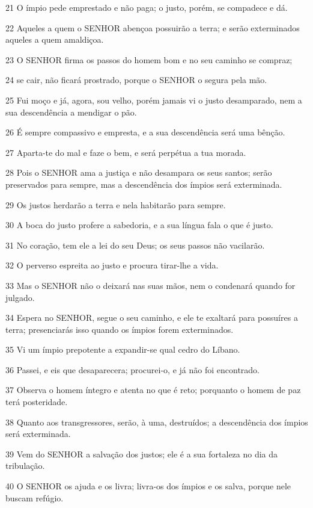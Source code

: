\par 21 O ímpio pede emprestado e não paga; o justo, porém, se compadece e dá.
\par 22 Aqueles a quem o SENHOR abençoa possuirão a terra; e serão exterminados aqueles a quem amaldiçoa.
\par 23 O SENHOR firma os passos do homem bom e no seu caminho se compraz;
\par 24 se cair, não ficará prostrado, porque o SENHOR o segura pela mão.
\par 25 Fui moço e já, agora, sou velho, porém jamais vi o justo desamparado, nem a sua descendência a mendigar o pão.
\par 26 É sempre compassivo e empresta, e a sua descendência será uma bênção.
\par 27 Aparta-te do mal e faze o bem, e será perpétua a tua morada.
\par 28 Pois o SENHOR ama a justiça e não desampara os seus santos; serão preservados para sempre, mas a descendência dos ímpios será exterminada.
\par 29 Os justos herdarão a terra e nela habitarão para sempre.
\par 30 A boca do justo profere a sabedoria, e a sua língua fala o que é justo.
\par 31 No coração, tem ele a lei do seu Deus; os seus passos não vacilarão.
\par 32 O perverso espreita ao justo e procura tirar-lhe a vida.
\par 33 Mas o SENHOR não o deixará nas suas mãos, nem o condenará quando for julgado.
\par 34 Espera no SENHOR, segue o seu caminho, e ele te exaltará para possuíres a terra; presenciarás isso quando os ímpios forem exterminados.
\par 35 Vi um ímpio prepotente a expandir-se qual cedro do Líbano.
\par 36 Passei, e eis que desaparecera; procurei-o, e já não foi encontrado.
\par 37 Observa o homem íntegro e atenta no que é reto; porquanto o homem de paz terá posteridade.
\par 38 Quanto aos transgressores, serão, à uma, destruídos; a descendência dos ímpios será exterminada.
\par 39 Vem do SENHOR a salvação dos justos; ele é a sua fortaleza no dia da tribulação.
\par 40 O SENHOR os ajuda e os livra; livra-os dos ímpios e os salva, porque nele buscam refúgio.


